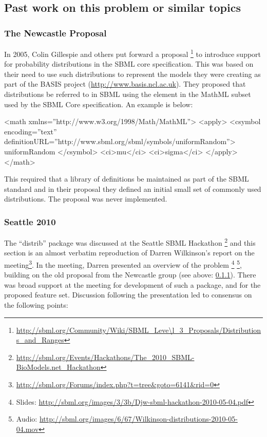 \documentclass[draftspec]{sbmlpkgspec}
\newcommand{\mathml}{MathML\xspace}
\begin{document}
\subsection{Past work on this problem or similar topics}

\subsubsection{The Newcastle Proposal}
\label{sec:newcastle proposal}

In 2005, Colin Gillespie and others put forward a proposal
\footnote{\url{http://sbml.org/Community/Wiki/SBML\_Leve\l_3\_Proposals/Distributions\_and\_Ranges}}
to introduce support for probability distributions in the SBML core specification. This
was based on their need to use such distributions to represent the
models they were creating as part of the BASIS project
(\url{http://www.basis.ncl.ac.uk}).
They proposed that distributions be referred to in SBML using
the  element in the \mathml subset used by
the SBML Core specification. An example is below:

\begin{example}
<math xmlns=''http://www.w3.org/1998/Math/MathML''>
  <apply>
    <csymbol encoding=''text''
        definitionURL=''http://www.sbml.org/sbml/symbols/uniformRandom''>
      uniformRandom
    </csymbol>
    <ci>mu</ci>
    <ci>sigma</ci>
  </apply>
</math>
\end{example}

This required that a library of definitions be maintained as part of
the SBML standard and in their proposal they defined an initial small
set of commonly used distributions. The proposal was never
implemented.

\subsubsection{Seattle 2010}

The ``distrib'' package was discussed at the Seattle SBML Hackathon%
\footnote{\url{http://sbml.org/Events/Hackathons/The_2010_SBML-BioModels.net_Hackathon}}
and this section is an almost verbatim reproduction of Darren
Wilkinson's report on the
meeting\footnote{\url{http://sbml.org/Forums/index.php?t=tree\&goto=6141\&rid=0}}. In the meeting,
Darren presented an overview of the problem%
\footnote{Slides: \url{http://sbml.org/images/3/3b/Djw-sbml-hackathon-2010-05-04.pdf}}%
\footnote{Audio: \url{http://sbml.org/images/6/67/Wilkinson-distributions-2010-05-04.mov}},
building on the old proposal from the Newcastle group (see above:
\ref{sec:newcastle proposal}).  There was broad support at the meeting
for development of such a package, and for the proposed feature
set. Discussion following the presentation led to consensus on the
following points:
\end{document}
